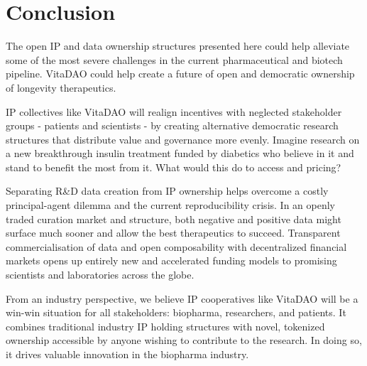 \documentclass[10pt,letterpaper]{article}
\begin{document}
\section{Conclusion}
The open IP and data ownership structures presented here could help alleviate some of the most severe challenges in the current pharmaceutical and biotech pipeline. VitaDAO could help create a future of open and democratic ownership of longevity therapeutics. 

IP collectives like VitaDAO will realign incentives with neglected stakeholder groups - patients and scientists - by creating alternative democratic research structures that distribute value and governance more evenly. Imagine research on a new breakthrough insulin treatment funded by diabetics who believe in it and stand to benefit the most from it. What would this do to access and pricing? 

Separating R\&D data creation from IP ownership helps overcome a costly principal-agent dilemma and the current reproducibility crisis. In an openly traded curation market and structure, both negative and positive data might surface much sooner and allow the best therapeutics to succeed. Transparent commercialisation of data and open composability with decentralized financial markets opens up entirely new and accelerated funding models to promising scientists and laboratories across the globe. 

From an industry perspective, we believe IP cooperatives like VitaDAO will be a win-win situation for all stakeholders: biopharma, researchers, and patients. It combines traditional industry IP holding structures with novel, tokenized ownership accessible by anyone wishing to contribute to the research. In doing so, it drives valuable innovation in the biopharma industry.

\clearpage


\raggedright 


 
\end{document}
